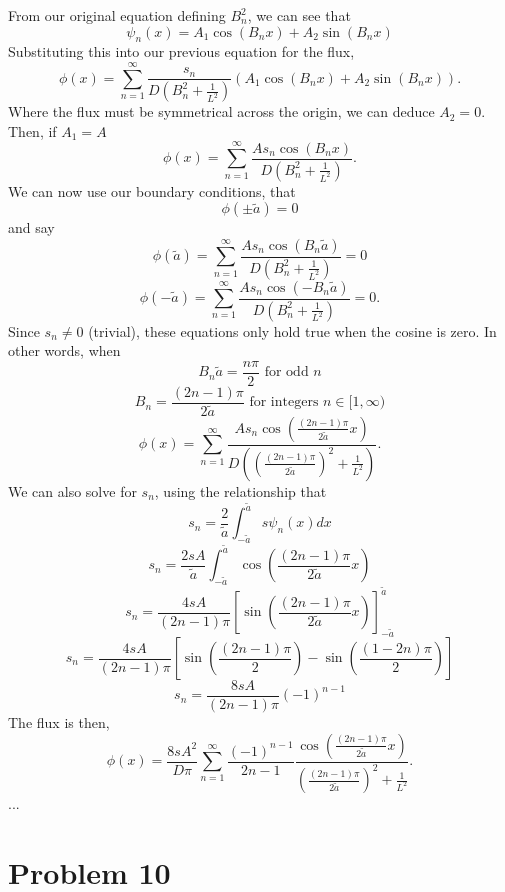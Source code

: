 \documentclass{article}
\begin{document}
From our original equation defining $B_n^2$, we can see that
$$ \psi_n(x) = A_1\cos(B_n x) + A_2\sin(B_n x) $$
Substituting this into our previous equation for the flux,
$$ \phi(x) = \sum_{n=1}^{\infty} \frac{s_n}{D\left( B_n^2 + \frac{1}{L^2} \right)} \left(A_1\cos(B_n x) + A_2\sin(B_n x) \right) .$$
Where the flux must be symmetrical across the origin, we can deduce $A_2 = 0$. Then, if $A_1 = A$
$$ \phi(x) = \sum_{n=1}^{\infty} \frac{A s_n \cos(B_n x)}{D\left( B_n^2 + \frac{1}{L^2} \right)} .$$
We can now use our boundary conditions, that
$$ \phi(\pm \tilde{a}) = 0 $$
and say
$$ \phi(\tilde{a}) = \sum_{n=1}^{\infty} \frac{A s_n \cos(B_n \tilde{a})}{D\left( B_n^2 + \frac{1}{L^2} \right)} = 0$$
$$ \phi(-\tilde{a}) = \sum_{n=1}^{\infty} \frac{A s_n \cos(-B_n \tilde{a})}{D\left( B_n^2 + \frac{1}{L^2} \right)} = 0.$$
Since $s_n \neq 0$ (trivial), these equations only hold true when the cosine is zero. In other words, when
$$ B_n \tilde{a} = \frac{n\pi}{2} \text{ for odd }n $$
$$ B_n = \frac{(2n-1)\pi}{2\tilde{a}} \text{ for integers }n \in [1,\infty)$$
$$ \phi(x) = \sum_{n=1}^{\infty} \frac{A s_n \cos\left(\frac{(2n-1)\pi}{2\tilde{a}} x\right)}{D\left( \left(\frac{(2n-1)\pi}{2\tilde{a}}\right)^2 + \frac{1}{L^2} \right)} .$$
We can also solve for $s_n$, using the relationship that
$$ s_n = \frac{2}{\tilde{a}}\int_{-\tilde{a}}^{\tilde{a}} s \psi_n(x) dx $$
$$ s_n = \frac{2sA}{\tilde{a}}\int_{-\tilde{a}}^{\tilde{a}} \cos\left( \frac{(2n-1)\pi}{2\tilde{a}}x\right) $$
$$ s_n = \frac{4sA}{(2n-1)\pi}\left[\sin\left(\frac{(2n-1)\pi}{2\tilde{a}}x\right)\right]_{-\tilde{a}}^{\tilde{a}} $$
$$ s_n = \frac{4sA}{(2n-1)\pi}\left[\sin\left(\frac{(2n-1)\pi}{2}\right) - \sin\left(\frac{(1-2n)\pi}{2}\right)\right] $$
$$ s_n = \frac{8sA}{(2n-1)\pi}(-1)^{n-1} $$
The flux is then,
$$ \phi(x) = \frac{8sA^2}{D\pi}\sum_{n=1}^{\infty} \frac{(-1)^{n-1}}{2n-1}\frac{\cos\left(\frac{(2n-1)\pi}{2\tilde{a}} x\right)}{\left(\frac{(2n-1)\pi}{2\tilde{a}}\right)^2 + \frac{1}{L^2}} .$$
...





\section*{Problem 10}
\end{document}
